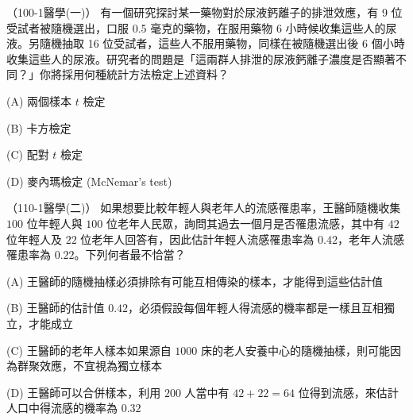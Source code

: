     \begin{docexam}{（100-1醫學(一)）}
        有一個研究探討某一藥物對於尿液鈣離子的排泄效應，有 9 位受試者被隨機選出，口服 0.5 毫克的藥物，在服用藥物 6 小時候收集這些人的尿液。另隨機抽取 16 位受試者，這些人不服用藥物，同樣在被隨機選出後 6 個小時收集這些人的尿液。研究者的問題是「這兩群人排泄的尿液鈣離子濃度是否顯著不同？」你將採用何種統計方法檢定上述資料？

        (A) 兩個樣本 $t$ 檢定

        (B) 卡方檢定

        (C) 配對 $t$ 檢定

        (D) 麥內瑪檢定 (McNemar's test)
    \end{docexam}
    
    \begin{docexam}{（110-1醫學(二)）}
        如果想要比較年輕人與老年人的流感罹患率，王醫師隨機收集 $100$ 位年輕人與 $100$ 位老年人民眾，詢問其過去一個月是否罹患流感，其中有 $42$ 位年輕人及 $22$ 位老年人回答有，因此估計年輕人流感罹患率為 $0.42$，老年人流感罹患率為 $0.22$。下列何者最不恰當？

        (A) 王醫師的隨機抽樣必須排除有可能互相傳染的樣本，才能得到這些估計值

        (B) 王醫師的估計值 $0.42$，必須假設每個年輕人得流感的機率都是一樣且互相獨立，才能成立

        (C) 王醫師的老年人樣本如果源自 $1000$ 床的老人安養中心的隨機抽樣，則可能因為群聚效應，不宜視為獨立樣本

        (D) 王醫師可以合併樣本，利用 $200$ 人當中有 $42+22=64$ 位得到流感，來估計人口中得流感的機率為 $0.32$
    \end{docexam}

